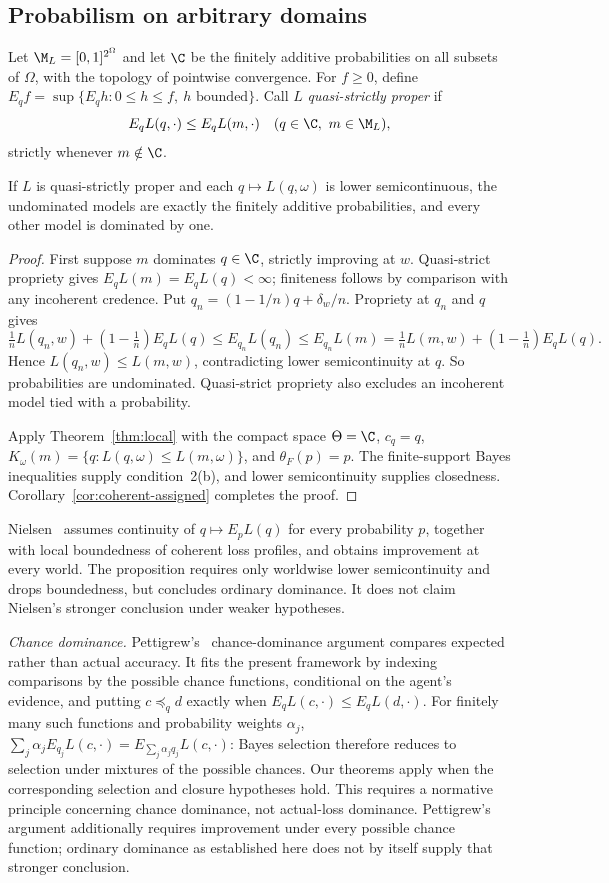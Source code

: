 \subsection{Probabilism on arbitrary domains}
Let $\M_L=[0,1]^{2^\Omega}$ and let $\C$ be the finitely additive probabilities on all subsets of $\Omega$, with the topology of pointwise convergence. For $f\ge0$, define $E_qf=\sup\{E_qh:0\le h\le f,\ h\text{ bounded}\}$. Call $L$ \emph{quasi-strictly proper} if
\[
E_qL(q,\cdot)\le E_qL(m,\cdot)\quad(q\in\C,\ m\in\M_L),
\]
strictly whenever $m\notin\C$.
\begin{proposition}\label{prop:short-infinite}
If $L$ is quasi-strictly proper and each $q\mapsto L(q,\omega)$ is lower semicontinuous, the undominated models are exactly the finitely additive probabilities, and every other model is dominated by one.
\end{proposition}
\begin{proof}
First suppose $m$ dominates $q\in\C$, strictly improving at $w$. Quasi-strict propriety gives $E_qL(m)=E_qL(q)<\infty$; finiteness follows by comparison with any incoherent credence. Put $q_n=(1-1/n)q+\delta_w/n$. Propriety at $q_n$ and $q$ gives
\[
\tfrac1nL(q_n,w)+(1-\tfrac1n)E_qL(q)
\le E_{q_n}L(q_n)\le E_{q_n}L(m)
=\tfrac1nL(m,w)+(1-\tfrac1n)E_qL(q).
\]
Hence $L(q_n,w)\le L(m,w)$, contradicting lower semicontinuity at $q$. So probabilities are undominated. Quasi-strict propriety also excludes an incoherent model tied with a probability.

Apply Theorem~\ref{thm:local} with the compact space $\Theta=\C$, $c_q=q$, $K_\omega(m)=\{q:L(q,\omega)\le L(m,\omega)\}$, and $\theta_F(p)=p$. The finite-support Bayes inequalities supply condition~2(b), and lower semicontinuity supplies closedness. Corollary~\ref{cor:coherent-assigned} completes the proof.
\end{proof}
Nielsen~\cite{Nielsen} assumes continuity of $q\mapsto E_pL(q)$ for every probability $p$, together with local boundedness of coherent loss profiles, and obtains improvement at every world. The proposition requires only worldwise lower semicontinuity and drops boundedness, but concludes ordinary dominance. It does not claim Nielsen's stronger conclusion under weaker hypotheses.

\emph{Chance dominance.} Pettigrew's~\cite[Chapter~10]{Pettigrew2016} chance-dominance argument compares expected rather than actual accuracy. It fits the present framework by indexing comparisons by the possible chance functions, conditional on the agent's evidence, and putting $c\preceq_q d$ exactly when $E_qL(c,\cdot)\le E_qL(d,\cdot)$. For finitely many such functions and probability weights $\alpha_j$, $\sum_j\alpha_j E_{q_j}L(c,\cdot)=E_{\sum_j\alpha_jq_j}L(c,\cdot)$: Bayes selection therefore reduces to selection under mixtures of the possible chances. Our theorems apply when the corresponding selection and closure hypotheses hold. This requires a normative principle concerning chance dominance, not actual-loss dominance. Pettigrew's argument additionally requires improvement under every possible chance function; ordinary dominance as established here does not by itself supply that stronger conclusion.

